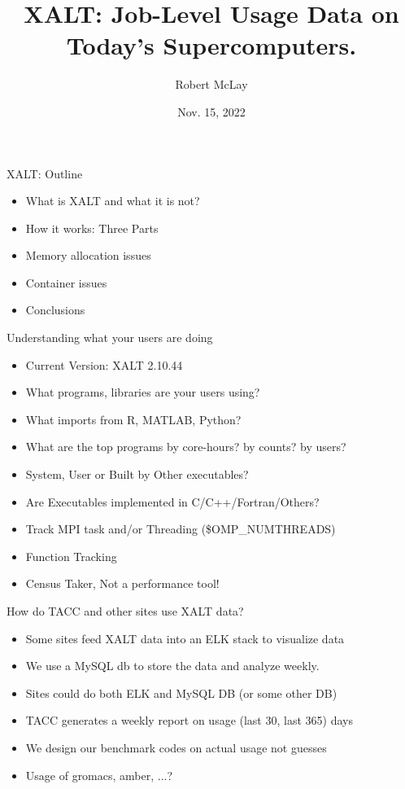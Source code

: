 \documentclass{beamer}
\begin{document}
\title[XALT]{XALT: Job-Level Usage Data on Today's Supercomputers.}
\author{Robert McLay} 
\date{Nov. 15, 2022}

\frame{\titlepage} 

\begin{frame}{XALT: Outline}
  \begin{itemize}
    \item What is XALT and what it is not?
    \item How it works: Three Parts
    \item Memory allocation issues
    \item Container issues
    \item Conclusions
  \end{itemize}
\end{frame}

\begin{frame}{Understanding what your users are doing}
  \begin{itemize}
    \item Current Version: XALT 2.10.44
    \item What programs, libraries are your users using?
    \item What imports from R, MATLAB, Python?
    \item What are the top programs by core-hours? by counts? by users?
    \item System, User or Built by Other executables?
    \item Are Executables implemented in C/C++/Fortran/Others?
    \item Track MPI task and/or Threading (\$OMP\_NUMTHREADS)
    \item Function Tracking
    \item Census Taker, Not a performance tool!
  \end{itemize}
\end{frame}

\begin{frame}{How do TACC and other sites use XALT data?}
  \begin{itemize}
    \item Some sites feed XALT data into an ELK stack to visualize data
    \item We use a MySQL db to store  the data and analyze weekly.
    \item Sites could do both ELK and MySQL DB (or some other DB)
    \item TACC generates a weekly report on usage (last 30, last 365) days
    \item We design our benchmark codes on actual usage not guesses
    \item Usage of gromacs, amber, ...?
  \end{itemize}
\end{frame}
\end{document}
